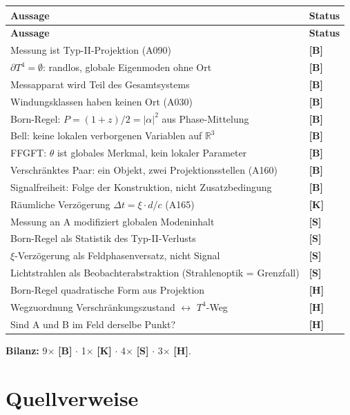 \begin{center}
\small
\begin{longtable}{@{}p{}l@{}}
\toprule
\textbf{Aussage} & \textbf{Status} \\
\midrule
\endfirsthead
\toprule
\textbf{Aussage} & \textbf{Status} \\
\midrule
\endhead
Messung ist Typ-II-Projektion (A090) & \textbf{[B]} \\
$\partial T^4 = \emptyset$: randlos, globale Eigenmoden ohne Ort & \textbf{[B]} \\
Messapparat wird Teil des Gesamtsystems & \textbf{[B]} \\
Windungsklassen haben keinen Ort (A030) & \textbf{[B]} \\
Born-Regel: $P = (1+z)/2 = |\alpha|^2$ aus Phase-Mittelung & \textbf{[B]} \\
Bell: keine lokalen verborgenen Variablen auf $\mathbb{R}^3$ & \textbf{[B]} \\
FFGFT: $\theta$ ist globales Merkmal, kein lokaler Parameter & \textbf{[B]} \\
Verschränktes Paar: ein Objekt, zwei Projektionsstellen (A160) & \textbf{[B]} \\
Signalfreiheit: Folge der Konstruktion, nicht Zusatzbedingung & \textbf{[B]} \\
Räumliche Verzögerung $\Delta t = \xi \cdot d/c$ (A165) & \textbf{[K]} \\
Messung an A modifiziert globalen Modeninhalt & \textbf{[S]} \\
Born-Regel als Statistik des Typ-II-Verlusts & \textbf{[S]} \\
$\xi$-Verzögerung als Feldphasenversatz, nicht Signal & \textbf{[S]} \\
Lichtstrahlen als Beobachterabstraktion (Strahlenoptik = Grenzfall) & \textbf{[S]} \\
Born-Regel quadratische Form aus Projektion & \textbf{[H]} \\
Wegzuordnung Verschränkungszustand $\leftrightarrow$ $T^4$-Weg & \textbf{[H]} \\
Sind A und B im Feld derselbe Punkt? & \textbf{[H]} \\
\bottomrule
\end{longtable}
\end{center}

\textbf{Bilanz:} 9$\times$ \textbf{[B]} $\cdot$
1$\times$ \textbf{[K]} $\cdot$
4$\times$ \textbf{[S]} $\cdot$
3$\times$ \textbf{[H]}.

\section{Quellverweise}

